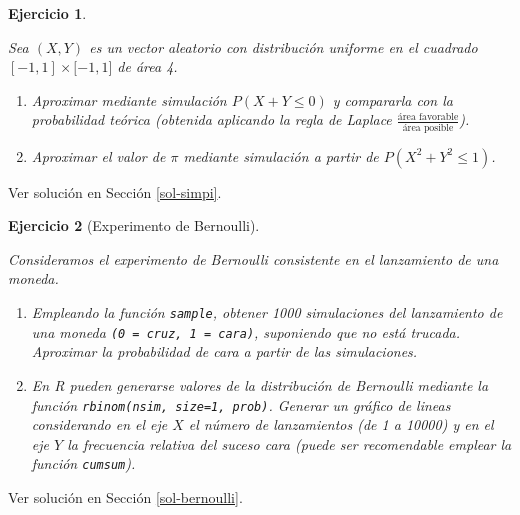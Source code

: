 \documentclass[
]{book}
\theoremstyle{break}
\newtheorem{exercise}{Ejercicio}[chapter]
\theoremstyle{nonumberplain}
\begin{document}
\begin{exercise}
\protect\hypertarget{exr:simpi}{}\label{exr:simpi}

Sea \((X,Y)\) es un vector aleatorio con distribución uniforme en el
cuadrado \([-1,1]\times\lbrack-1,1]\) de área 4.

\begin{enumerate}
\def\labelenumi{\alph{enumi})}
\item
  Aproximar mediante simulación \(P\left(X + Y \leq 0 \right)\) y
  compararla con la probabilidad teórica (obtenida aplicando la
  regla de Laplace \(\frac{\text{área favorable}}{\text{área posible}}\)).
\item
  Aproximar el valor de \(\pi\) mediante simulación a partir de
  \(P\left( X^2 +Y^2 \leq 1 \right)\).
\end{enumerate}

\end{exercise}

Ver solución en Sección \ref{sol-simpi}.

\begin{exercise}[Experimento de Bernoulli]
\protect\hypertarget{exr:bernoulli}{}\label{exr:bernoulli}

Consideramos el experimento de Bernoulli consistente en el
lanzamiento de una moneda.

\begin{enumerate}
\def\labelenumi{\alph{enumi})}
\item
  Empleando la función \texttt{sample}, obtener 1000 simulaciones del
  lanzamiento de una moneda \texttt{(0\ =\ cruz,\ 1\ =\ cara)}, suponiendo que
  no está trucada. Aproximar la probabilidad de cara a partir de
  las simulaciones.
\item
  En R pueden generarse valores de la distribución de Bernoulli
  mediante la función \texttt{rbinom(nsim,\ size=1,\ prob)}. Generar un
  gráfico de lineas considerando en el eje \(X\) el número de
  lanzamientos (de 1 a 10000) y en el eje \(Y\) la frecuencia
  relativa del suceso cara (puede ser recomendable emplear la
  función \texttt{cumsum}).
\end{enumerate}

\end{exercise}

Ver solución en Sección \ref{sol-bernoulli}.
\end{document}
